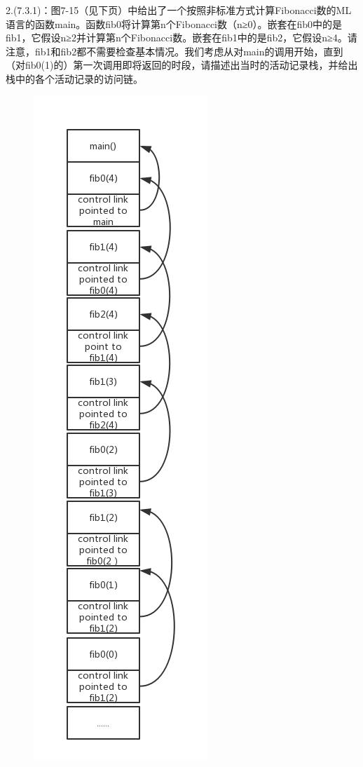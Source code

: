\documentclass[a4paper, 16pt]{article}
\begin{document}
2.(7.3.1)：图7-15（见下页）中给出了一个按照非标准方式计算Fibonacci数的ML语言的函数main。函数fib0将计算第n个Fibonacci数（n≥0）。嵌套在fib0中的是fib1，它假设n≥2并计算第n个Fibonacci数。嵌套在fib1中的是fib2，它假设n≥4。请注意，fib1和fib2都不需要检查基本情况。我们考虑从对main的调用开始，直到（对fib0(1)的）第一次调用即将返回的时段，请描述出当时的活动记录栈，并给出栈中的各个活动记录的访问链。
\begin{figure}[H]
\centering
\includegraphics[scale = 0.6]{chapter7_2}
\label{f1}
\end{figure}
\end{document}
